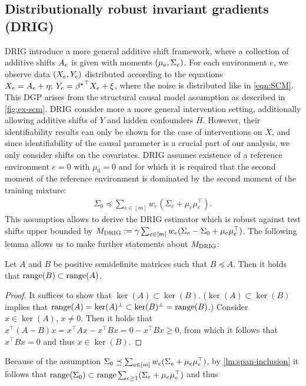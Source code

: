 \subsection{Distributionally robust invariant gradients (DRIG) \cite{shen2023causalityoriented}}\label{subsec:drig}
DRIG \cite{shen2023causalityoriented} introduce a more general additive shift framework, where a collection of additive shifts $A_e$ is given with moments $(\mu_e,\Sigma_e)$. For each environment $e$, we observe data $(X_e, Y_e)$ distributed according to the equations $X_e= A_e + \eta; \: Y_e = {\beta^{\star}}^\top X_e + \xi$, where the noise is distributed like in \cref{eqn:SCM}. This DGP arises from the structural causal model assumption as described in \cref{fig:ex-scm}.  DRIG consider more a more general intervention setting, additionally allowing additive shifts of $Y$ and hidden confounders $H$. However, their identifiability results can only be shown for the case of interventions on $X$, and since identifiability of the causal parameter is a crucial part of our analysis, we only consider shifts on the covariates. DRIG assumes existence of a reference environment  $e = 0$ with $\mu_0 = 0$ and for which it is required that the second moment of the reference environment is dominated by the second moment of the training mixture: 
\begin{align*}
    \Sigma_0 \preceq \sum_{e \in [m]} w_e (\Sigma_e + \mu_e \mu_e^\top).
\end{align*}
This assumption allows \cite{shen2023causalityoriented} to derive the DRIG estimator which is robust against test shifts upper bounded by $M_{\mathrm{DRIG}} :=  \gamma \sum_{e \in [m]} w_e (\Sigma_e - \Sigma_0 + \mu_e \mu_e^\top)$. The following lemma allows us to make further statements about $M_{\mathrm{DRIG}}$:
\begin{lemma}\label{lm:span-inclusion}
    Let $A$ and $B$ be positive semidefinite matrices such that $B \preceq A$. Then it holds that $\mathrm{range}(B) \subset \mathrm{range}(A)$. 
\end{lemma}
\begin{proof}
    It suffices to show that $\ker(A) \subset \ker(B)$. ($\ker(A) \subset \ker (B)$ implies that $\mathrm{range}(A) = \ker (A)^\perp  \subset \ker(B)^\perp = \mathrm{range}(B)  $.) Consider $x \in \ker(A)$, $x \neq 0$. Then it holds that $x^\top (A - B) x = x^\top A x - x^\top B x = 0 - x^\top B x \geq 0$, from which it follows that $x^\top B x = 0$ and thus $x \in \ker(B)$. 
\end{proof}
Because of the assumption $\Sigma_0 \preceq \sum_{e \in [m]} w_e (\Sigma_e + \mu_e \mu_e^\top)$, by \cref{lm:span-inclusion} it follows that $\mathrm{range}(\Sigma_0) \subset \mathrm{range} \sum_{e \geq 1} ( \Sigma_e + \mu_e \mu_e^\top )$  and thus 
